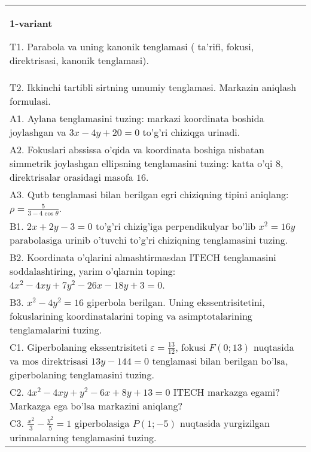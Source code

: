 \documentclass{article}
\begin{document}
\large
{}


\begin{tabular}{m{17cm}}
\textbf{1-variant}
\newline

T1. Parabola va uning kanonik tenglamasi ( ta'rifi, fokusi, direktrisasi, kanonik tenglamasi).\\

T2. Ikkinchi tartibli sirtning umumiy tenglamasi. Markazin aniqlash formulasi.\\

A1. Aylana tenglamasini tuzing: markazi koordinata boshida joylashgan va $3x-4y+20=0$ to'g'ri chiziqga urinadi.\\

A2. Fokuslari abssissa o'qida va koordinata boshiga nisbatan simmetrik joylashgan ellipsning tenglamasini tuzing: katta o'qi $8$, direktrisalar orasidagi masofa $16$.\\

A3. Qutb tenglamasi bilan berilgan egri chiziqning tipini aniqlang: $\rho=\frac{5}{3-4\cos\theta}$.\\

B1. $2x + 2y - 3 = 0$ to'g'ri chizig'iga perpendikulyar bo'lib $x^{2} = 16y$ parabolasiga urinib o'tuvchi to'g'ri chiziqning tenglamasini tuzing.  \\

B2. Koordinata o'qlarini almashtirmasdan ITECH tenglamasini soddalashtiring, yarim o'qlarnin toping: $4x^{2} - 4xy + 7y^{2} - 26x - 18y + 3 = 0$.\\

B3. $x^{2} - 4y^{2} = 16$ giperbola berilgan. Uning ekssentrisitetini, fokuslarining koordinatalarini toping va asimptotalarining tenglamalarini tuzing.\\

C1. Giperbolaning ekssentrisiteti $\varepsilon = \frac{13}{12}$, fokusi $F(0;13)$ nuqtasida va mos direktrisasi $13y - 144 = 0$ tenglamasi bilan berilgan bo'lsa, giperbolaning tenglamasini tuzing.  \\

C2. $4x^{2} - 4xy + y^{2} - 6x + 8y + 13 = 0$ ITECH markazga egami? Markazga ega bo'lsa markazini aniqlang?  \\

C3. $\frac{x^{2}}{3} - \frac{y^{2}}{5} = 1$ giperbolasiga $P(1; - 5)$ nuqtasida yurgizilgan urinmalarning tenglamasini tuzing.\\

\end{tabular}
\vspace{1cm}
\end{document}
